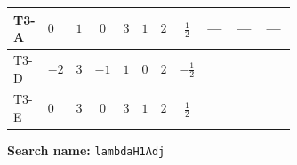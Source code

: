 \documentclass[8pt]{article}
\begin{document}
\begin{landscape}
\begin{longtable}{@{}llcccccc >{\raggedright\arraybackslash}p{0.21\linewidth} >{\raggedright\arraybackslash}p{0.21\linewidth} >{\raggedright\arraybackslash}p{0.21\linewidth}@{}}
\midrule
T3-A & $0$ & $1$ & $0$ & $3$ & $1$ & $2$ & $\frac{1}{2}$ & --- & --- & --- \\
\midrule
T3-D & $-2$ & $3$ & $-1$ & $1$ & $0$ & $2$ & $-\frac{1}{2}$ & \scriptsize\adjustbox{max width=\linewidth}{$\begin{gathered} +8 {\lambda_{H1}} {\lambda_{H1}^{\rm Adj}}\end{gathered}$} & \scriptsize\adjustbox{max width=\linewidth}{$\begin{gathered} +2 {\lambda_{H1}^{\rm Adj}} {\lambda_{S_1}}\end{gathered}$} & \scriptsize\adjustbox{max width=\linewidth}{$\begin{gathered} {\lambda_{H1}^{\rm Adj}} (6 \operatorname{Tr}\!\left({Y_d}\,\left({Y_d}\right)^{\dagger}\right)+2 \operatorname{Tr}\!\left({Y_e}\,\left({Y_e}\right)^{\dagger}\right)+6 \operatorname{Tr}\!\left({Y_u}\,\left({Y_u}\right)^{\dagger}\right)+16 {\lambda_{S_1}^{\rm Adj}})\end{gathered}$} \\
\midrule
T3-E & $0$ & $3$ & $0$ & $3$ & $1$ & $2$ & $\frac{1}{2}$ & \scriptsize\adjustbox{max width=\linewidth}{$\begin{gathered} +8 {\lambda_{H1}} {\lambda_{H1}^{\rm Adj}}\end{gathered}$} & \scriptsize\adjustbox{max width=\linewidth}{$\begin{gathered} +2 {\lambda_{H1}^{\rm Adj}} {\lambda_{S_1}}\end{gathered}$} & \scriptsize\adjustbox{max width=\linewidth}{$\begin{gathered} {\lambda_{H1}^{\rm Adj}} (6 \operatorname{Tr}\!\left({Y_d}\,\left({Y_d}\right)^{\dagger}\right)+2 \operatorname{Tr}\!\left({Y_e}\,\left({Y_e}\right)^{\dagger}\right)+6 \operatorname{Tr}\!\left({Y_u}\,\left({Y_u}\right)^{\dagger}\right)+16 {\lambda_{S_1}^{\rm Adj}})\end{gathered}$} \\
\midrule
\bottomrule
\end{longtable}
\clearpage
\noindent\textbf{Search name: }\texttt{lambdaH1Adj}\par\smallskip

\end{landscape}
\end{document}

